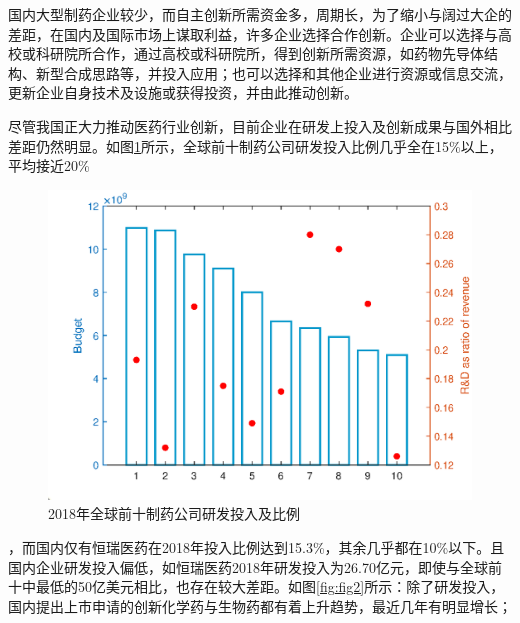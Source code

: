 \documentclass[twocolumn,openany]{ctexbook}
\begin{document}
国内大型制药企业较少，而自主创新所需资金多，周期长，为了缩小与阔过大企的差距，在国内及国际市场上谋取利益，许多企业选择合作创新。企业可以选择与高校或科研院所合作，通过高校或科研院所，得到创新所需资源，如药物先导体结构、新型合成思路等，并投入应用；也可以选择和其他企业进行资源或信息交流，更新企业自身技术及设施或获得投资，并由此推动创新\citep{RN9}。

尽管我国正大力推动医药行业创新，目前企业在研发上投入及创新成果与国外相比差距仍然明显。如图\ref{fig:fig1}所示，全球前十制药公司研发投入比例几乎全在15\%以上，平均接近20\%\citep{RN20}
\begin{figure}[tb]
	\centering
	\includegraphics[width=1\linewidth]{fig1}
	\caption{2018年全球前十制药公司研发投入及比例}
	\label{fig:fig1}
\end{figure}
，而国内仅有恒瑞医药在2018年投入比例达到15.3\%，其余几乎都在10\%以下。且国内企业研发投入偏低，如恒瑞医药2018年研发投入为26.70亿元，即使与全球前十中最低的50亿美元相比，也存在较大差距。如图\ref{fig:fig2}所示：除了研发投入，国内提出上市申请的创新化学药与生物药都有着上升趋势，最近几年有明显增长\citep{RN19}；
\end{document}
